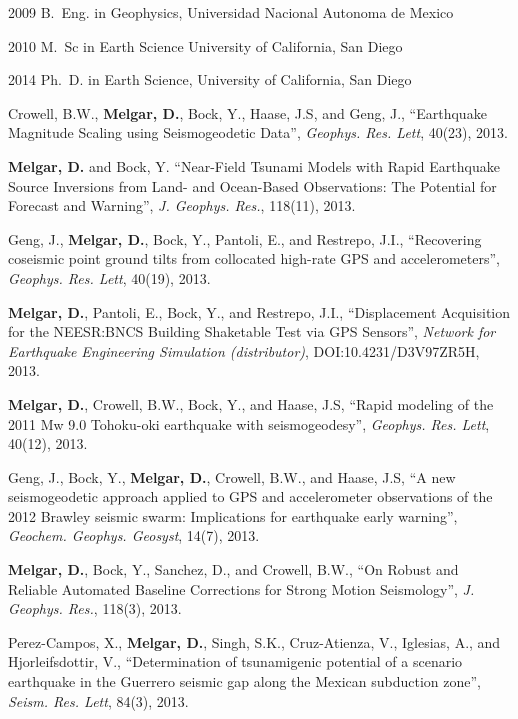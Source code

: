 \begin{frontmatter}
%
%
\begin{vitapage}
\begin{vita}
  \item[2009] B.~Eng. in Geophysics, Universidad Nacional Autonoma de Mexico
  \item[2010] M.~Sc in Earth Science University of California, San Diego
  \item[2014] Ph.~D. in Earth Science, University of California, San Diego 
\end{vita}
\begin{publications}
\item Crowell, B.W., \textbf{Melgar, D.}, Bock, Y., Haase, J.S, and Geng, J., ``Earthquake Magnitude Scaling using Seismogeodetic Data'', \emph{Geophys. Res. Lett}, 40(23), 2013.
\item \textbf{Melgar, D.} and Bock, Y. ``Near-Field Tsunami Models with Rapid Earthquake Source Inversions from Land- and Ocean-Based Observations: The Potential for Forecast and Warning'', \emph{J. Geophys. Res.}, 118(11), 2013.
\item Geng, J., \textbf{Melgar, D.}, Bock, Y., Pantoli, E., and Restrepo, J.I., ``Recovering coseismic point ground tilts from collocated high-rate GPS and accelerometers'', \emph{Geophys. Res. Lett}, 40(19), 2013.
\item \textbf{Melgar, D.}, Pantoli, E., Bock, Y., and Restrepo, J.I., ``Displacement Acquisition for the NEESR:BNCS Building Shaketable Test via GPS Sensors'', \emph{Network for Earthquake Engineering Simulation (distributor)}, DOI:10.4231/D3V97ZR5H, 2013.
\item \textbf{Melgar, D.}, Crowell, B.W., Bock, Y., and Haase, J.S, ``Rapid modeling of the 2011 Mw 9.0 Tohoku-oki earthquake with seismogeodesy'', \emph{Geophys. Res. Lett}, 40(12), 2013.
\item Geng, J., Bock, Y., \textbf{Melgar, D.}, Crowell, B.W., and Haase, J.S, ``A new seismogeodetic approach applied to GPS and accelerometer observations of the 2012 Brawley seismic swarm: Implications for earthquake early warning'', \emph{Geochem. Geophys. Geosyst}, 14(7), 2013.
\item \textbf{Melgar, D.}, Bock, Y., Sanchez, D., and Crowell, B.W., ``On Robust and Reliable Automated Baseline Corrections for Strong Motion Seismology'', \emph{J. Geophys. Res.}, 118(3), 2013.
\item Perez-Campos, X., \textbf{Melgar, D.}, Singh, S.K., Cruz-Atienza, V., Iglesias, A., and Hjorleifsdottir, V., ``Determination of tsunamigenic potential of a scenario earthquake in the Guerrero seismic gap along the Mexican subduction zone'', \emph{Seism. Res. Lett}, 84(3), 2013.

\end{publications}
\end{vitapage}
\end{frontmatter}
